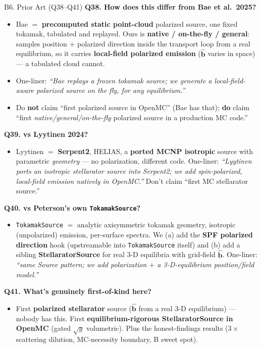 \documentclass[11pt,aspectratio=169]{beamer}
\newcommand{\bhat}{\hat{\mathbf{b}}}
\newcommand{\qitem}[1]{\medskip\textbf{#1}\par}
\begin{document}
\begin{frame}[allowframebreaks]{B6. Prior Art (Q38--Q41)}
\small
\qitem{Q38. How does this differ from Bae et al.\ 2025?}
\begin{itemize}
\item Bae $=$ \textbf{precomputed static point-cloud} polarized source, one fixed tokamak,
      tabulated and replayed. Ours is \textbf{native / on-the-fly / general}: samples
      position $+$ polarized direction inside the transport loop from a real equilibrium, so it
      carries \textbf{local-field polarized emission} ($\bhat$ varies in space) --- a tabulated
      cloud cannot.
\item One-liner: \emph{``Bae replays a frozen tokamak source; we generate a local-field-aware
      polarized source on the fly, for any equilibrium.''}
\item Do \textbf{not} claim ``first polarized source in OpenMC'' (Bae has that); \textbf{do}
      claim ``first \emph{native/general/on-the-fly} polarized source in a production MC code.''
\end{itemize}

\qitem{Q39. vs Lyytinen 2024?}
\begin{itemize}
\item Lyytinen $=$ \textbf{Serpent2}, HELIAS, a \textbf{ported MCNP isotropic} source with
      parametric \emph{geometry} --- no polarization, different code. One-liner:
      \emph{``Lyytinen ports an isotropic stellarator source into Serpent2; we add
      spin-polarized, local-field emission natively in OpenMC.''} Don't claim ``first MC
      stellarator source.''
\end{itemize}

\framebreak
\qitem{Q40. vs Peterson's own \texttt{TokamakSource}?}
\begin{itemize}
\item \texttt{TokamakSource} $=$ analytic axisymmetric tokamak geometry, isotropic
      (unpolarized) emission, per-surface spectra. We (a) add the \textbf{SPF polarized
      direction} hook (upstreamable into \texttt{TokamakSource} itself) and (b) add a sibling
      \textbf{StellaratorSource} for real 3-D equilibria with grid-field $\bhat$. One-liner:
      \emph{``same Source pattern; we add polarization $+$ a 3-D-equilibrium position/field
      model.''}
\end{itemize}

\qitem{Q41. What's genuinely first-of-kind here?}
\begin{itemize}
\item First \textbf{polarized stellarator} source ($\bhat$ from a real 3-D equilibrium) ---
      nobody has this. First \textbf{equilibrium-rigorous StellaratorSource in OpenMC} (gated
      $\sqrt{g}$ volumetric). Plus the honest-findings results ($3\times$ scattering dilution,
      MC-necessity boundary, B sweet spot).
\end{itemize}
\end{frame}
\end{document}
